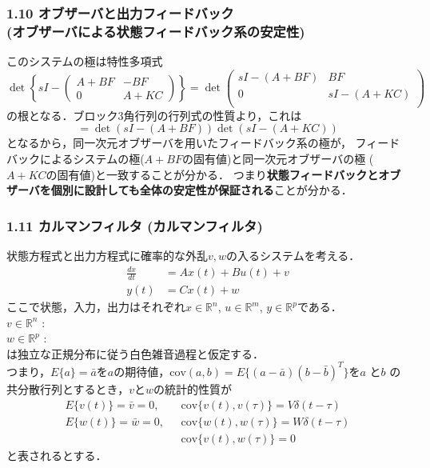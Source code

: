 \begin{frame}[t]
\frametitle{1.10 オブザーバと出力フィードバック \\
(オブザーバによる状態フィードバック系の安定性)}
このシステムの極は特性多項式
{\small
\begin{equation}
 \det\left\{s I - \left(\begin{array}{cc}
             A + BF & -BF \\
       0 & A + KC
      \end{array}\right)\right\}
 =
 \det\left(\begin{array}{cc}
            sI - (A + BF) & BF \\
      0 & sI - (A + KC) \\
     \end{array}\right)
\end{equation}
}
の根となる．ブロック3角行列の行列式の性質より，これは
\begin{equation}
 = \det(sI - (A + BF))\det(sI - (A + KC))
\end{equation}
となるから，同一次元オブザーバを用いたフィードバック系の極が，
フィードバックによるシステムの極($A + BF$の固有値)と同一次元オブザーバの極
($A + KC$の固有値)と一致することが分かる．
つまり{\bf 状態フィードバックとオブザーバを個別に設計しても全体の安定性が保証される}ことが分かる．

\end{frame}


\begin{frame}[t]
\frametitle{1.11 カルマンフィルタ (カルマンフィルタ)}
状態方程式と出力方程式に確率的な外乱$v,w$の入るシステムを考える．
\begin{align}
 \frac{dx}{dt} &= A x(t) + B u(t) +  v \label{state_eq_dis} \\
 y(t) &= C x(t) + w \label{output_eq_dis}
\end{align}
ここで状態，入力，出力はそれぞれ$x \in {\mathbb R}^n$, $ u \in {\mathbb R}^m $, $ y \in {\mathbb R}^p $である．\\
$v \in {\mathbb R}^n$ :  \\
$w \in {\mathbb R}^p$ :  \\は独立な正規分布に従う白色雑音過程と仮定する．\\
つまり，$E\{ a \} = \bar{a} $を$a$の期待値，$\mbox{cov}(a,b) = E \{ (a-\bar{a})(b-\bar{b})^T \}$を$a$ と$b$ の共分散行列とするとき，$v$と$w$の統計的性質が
\begin{align}
     E \{ v(t) \} = \bar{v} = 0, & \ \ \ \mbox{cov}\{ v(t), v(\tau)\} = V \delta(t-\tau)
\\
     E \{ w(t) \} = \bar{w} = 0, & \ \ \ \mbox{cov}\{ w(t), w(\tau)\} = W \delta(t-\tau)
\\
                       & \ \ \ \mbox{cov} \{v(t), w(\tau) \} =0
\end{align}
と表されるとする．\\
\end{frame}


